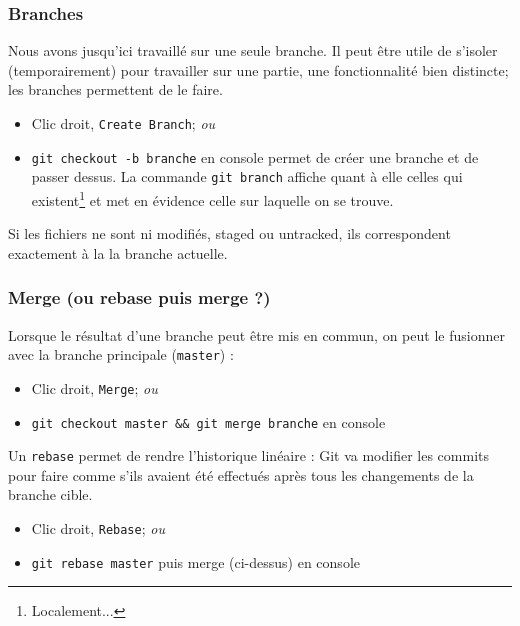 \documentclass[compress]{beamer}
\begin{document}
\begin{frame}
	\frametitle{Branches}
	Nous avons jusqu'ici travaillé sur une seule branche. Il peut être utile de
	s'isoler (temporairement) pour travailler sur une partie, une fonctionnalité
	bien distincte; les branches permettent de le faire.
	\begin{itemize}
		\item Clic droit, \texttt{Create Branch}; \textit{ou} %
		\item \texttt{git checkout -b branche} en console permet de créer une
			branche et de passer dessus.
			La commande \texttt{git branch} affiche quant à elle celles
			qui existent\footnote{Localement...} et
			met en évidence celle sur laquelle on se trouve.
	\end{itemize}

	Si les fichiers ne sont ni modifiés, staged ou untracked, ils correspondent
	exactement à la la branche actuelle.
\end{frame}

\begin{frame}
	\frametitle{Merge (ou rebase puis merge ?)}
	Lorsque le résultat d'une branche peut être mis en commun, on peut le
	fusionner avec la branche principale (\texttt{master}) :
	\begin{itemize}
		\item Clic droit, \texttt{Merge}; \textit{ou} %
		\item \texttt{git checkout master \&\& git merge branche} en console
	\end{itemize}

	Un \texttt{rebase} permet de rendre l'historique linéaire : Git va modifier
	les commits pour faire comme s'ils avaient été effectués après tous les
	changements de la branche cible.
	\begin{itemize}
		\item Clic droit, \texttt{Rebase}; \textit{ou} %
		\item \texttt{git rebase master} puis merge (ci-dessus) en console
	\end{itemize}
\end{frame}
\end{document}
